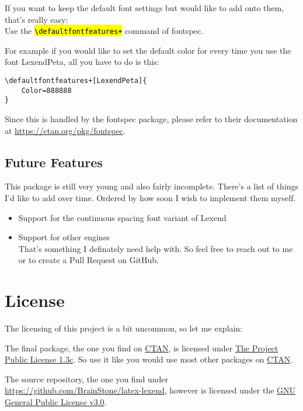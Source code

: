 \documentclass[oneside,a4paper]{l3doc}
\DeclareRobustCommand{\code}[1]{{\sethlcolor{lightgray}\texttt{\hl{#1}}}}
\providecommand{\tightlist}{%
  \setlength{\itemsep}{0pt}\setlength{\parskip}{0pt}}
\begin{document}
If you want to keep the default font settings but would like to add onto them, that's really easy:\\
Use the \code{\textbackslash{}defaultfontfeatures+} command of \textsf{fontspec}.

\bigskip

For example if you would like to set the default color for every time you use the font
\textsf{LexendPeta}, all you have to do is this:

\begin{lstlisting}[language={[LaTeX]TeX},caption={\code{\textbackslash{}defaultfontfeatures+} Example}]
\defaultfontfeatures+[LexendPeta]{
	Color=888888
}
\end{lstlisting}

Since this is handled by the \textsf{fontspec} package, please refer to their documentation at
\url{https://ctan.org/pkg/fontspec}.

\subsection{Future Features}\label{subsec:future-features}

This package is still very young and also fairly incomplete. There's a list of things I'd like to
add over time. Ordered by how soon I wish to implement them myself.

\begin{itemize}
\item Support for the continuous spacing font variant of Lexend\tightlist
\item Support for other  engines\\
	That's something I definately need help with. So feel free to reach out to me or to create a
	Pull Request on GitHub.\tightlist
\end{itemize}

\section{License}

The licensing of this project is a bit uncommon, so let me explain:

The final package, the one you find on \href{https://ctan.org/}{CTAN}, is licensed under
\href{https://ctan.org/license/lppl1.3c}{The  Project Public License 1.3c}. So use it
like you would use most other packages on \href{https://ctan.org/}{CTAN}.

The source repository, the one you find under \url{https://github.com/BrainStone/latex-lexend},
however is licensed under the \href{https://www.gnu.org/licenses/gpl-3.0.html}{GNU General Public
License v3.0}.
\end{document}
